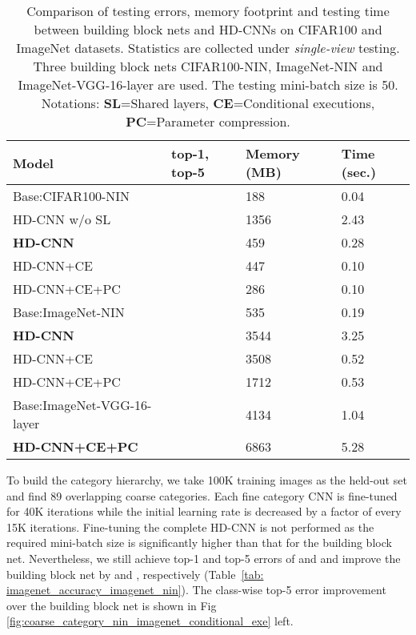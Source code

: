 \documentclass[10pt,twocolumn,letterpaper]{article}
\begin{document}
{\renewcommand{\arraystretch}{1.2}\begin{table}[ht]
\vspace{-1em}
\caption{Comparison of testing errors, memory footprint and testing time between building block nets and HD-CNNs on CIFAR100 and ImageNet datasets. Statistics are collected under \textit{single-view} testing. Three building block nets CIFAR100-NIN, ImageNet-NIN and ImageNet-VGG-16-layer are used. The testing mini-batch size is 50. Notations: \textbf{SL}=Shared layers, \textbf{CE}=Conditional executions, \textbf{PC}=Parameter compression.}
\label{tab: internal_comp} 
\vspace{-1em}
\begin{center}
    \begin{tabular}{  p{3.3cm} | p{2.0cm} | p{1.0cm} |p{0.6cm} }
    Model & top-1, top-5 & Memory (MB) & Time (sec.) \\ 
    \hline \hline
    Base:CIFAR100-NIN &   &  188 & 0.04 \\ \hline  
    HD-CNN w/o SL &   &  1356  & 2.43 \\ \hline     
    \textbf{HD-CNN} &   &  459  & 0.28 \\ \hline     
    HD-CNN+CE &   &  447  & 0.10 \\ \hline 
    HD-CNN+CE+PC &   &  286  & 0.10 \\ \hline
    \hline
    Base:ImageNet-NIN &   &  535 & 0.19 \\ \hline       
	\textbf{HD-CNN} &   &  3544 & 3.25 \\ \hline    
    HD-CNN+CE&   &  3508 & 0.52 \\ \hline    
    HD-CNN+CE+PC&   &  1712 & 0.53 \\ \hline
    \hline 
    Base:ImageNet-VGG-16-layer &   & 4134 & 1.04 \\ \hline 
    \textbf{HD-CNN+CE+PC}&   &  6863 & 5.28 \\ \hline 
    \end{tabular}   
\end{center}
\vspace{-0.5em}
\end{table}
}

To build the category hierarchy, we take 100K training images as the held-out set and find 89 overlapping coarse categories. 
Each fine category CNN is fine-tuned for 40K iterations while the initial learning rate  is decreased by a factor of  every 15K iterations. Fine-tuning the complete HD-CNN is not performed as the required mini-batch size is significantly higher than that for the building block net. Nevertheless, we still achieve top-1 and top-5 errors of  and  and improve the building block net by  and , respectively (Table~\ref{tab: imagenet_accuracy_imagenet_nin}). The class-wise top-5 error improvement over the building block net is shown in Fig \ref{fig:coarse_category_nin_imagenet_conditional_exe} left.
\end{document}
